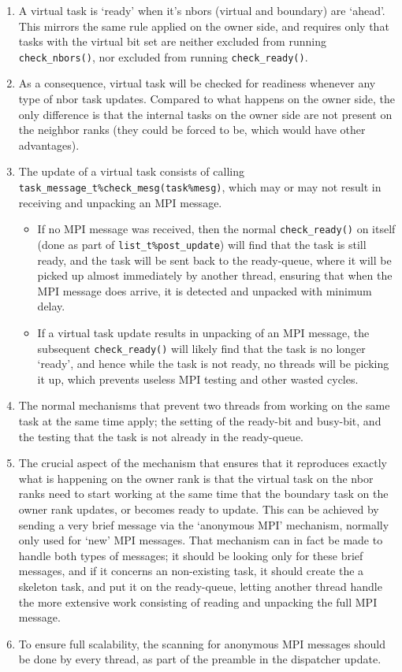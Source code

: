 \documentclass[paper=a4,fontsize=11pt]{scrartcl}
\numberwithin{equation}{section}		%
\numberwithin{figure}{section}			%
\numberwithin{table}{section}				%
\newcommand{\codecolor}{\color{Blue}}
\newcommand{\Code}[1]{{\codecolor\texttt{#1}}}
\def\checkready{\Code{check\_ready()}}
\def\checknbors{\Code{check\_nbors()}}
\begin{document}
\begin{enumerate}
    \item A virtual task is `ready' when it's nbors (virtual and boundary) are `ahead'.  This mirrors the same rule applied on the owner side, and requires only that tasks with the virtual bit set are neither excluded from running \checknbors, nor excluded from running \checkready.
    \item As a consequence, virtual task will be checked for readiness whenever any type of nbor task updates.  Compared to what happens on the owner side, the only difference is that the internal tasks on the owner side are not present on the neighbor ranks (they could be forced to be, which would have other advantages).
    \item The update of a virtual task consists of calling \Code{task\_message\_t\%check\_mesg(task\%mesg)}, which may or may not result in receiving and unpacking an MPI message.
\begin{itemize}
    \item If no MPI message was received, then the normal \checkready{} on itself (done as part of \Code{list\_t\%post\_update}) will find that the task is still ready, and the task will be sent back to the ready-queue, where it will be picked up almost immediately by another thread, ensuring that when the MPI message does arrive, it is detected and unpacked with minimum delay.
    \item If a virtual task update results in unpacking of an MPI message, the subsequent \checkready{} will likely find that the task is no longer `ready', and hence while the task is not ready, no threads will be picking it up, which prevents useless MPI testing and other wasted cycles.
\end{itemize}
    \item The normal mechanisms that prevent two threads from working on the same task at the same time apply; the setting of the ready-bit and busy-bit, and the testing that the task is not already in the ready-queue.
    \item The crucial aspect of the mechanism that ensures that it reproduces exactly what is happening on the owner rank is that the virtual task on the nbor ranks need to start working at the same time that the boundary task on the owner rank updates, or becomes ready to update.  This can be achieved by sending a very brief message via the `anonymous MPI' mechanism, normally only used for `new' MPI messages. That mechanism can in fact be made to handle both types of messages; it should be looking only for these brief messages, and if it concerns an non-existing task, it should create the a skeleton task, and put it on the ready-queue, letting another thread handle the more extensive work consisting of reading and unpacking the full MPI message.
    \item To ensure full scalability, the scanning for anonymous MPI messages should be done by every thread, as part of the preamble in the dispatcher update.
\end{enumerate}
\end{document}
